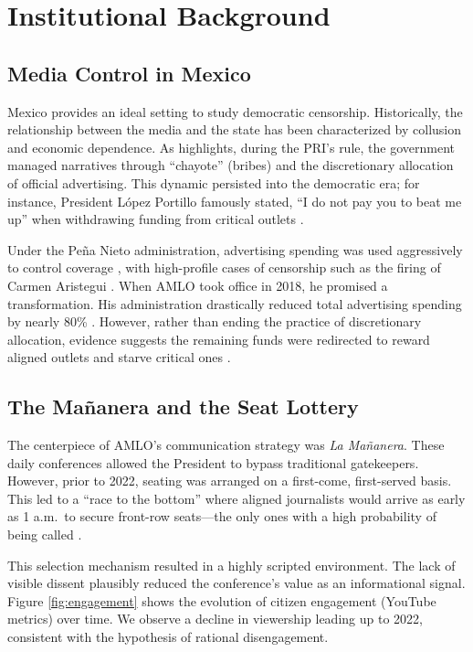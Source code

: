 \documentclass[12pt]{article}
\begin{document}
\section{Institutional Background}

\subsection{Media Control in Mexico}
Mexico provides an ideal setting to study democratic censorship. Historically, the relationship between the media and the state has been characterized by collusion and economic dependence. As \cite{FourthState-Lawson-Book} highlights, during the PRI's rule, the government managed narratives through ``chayote'' (bribes) and the discretionary allocation of official advertising. This dynamic persisted into the democratic era; for instance, President López Portillo famously stated, ``I do not pay you to beat me up'' when withdrawing funding from critical outlets \citep{PrensaVendida-Rod}.

Under the Peña Nieto administration, advertising spending was used aggressively to control coverage \citep{Times}, with high-profile cases of censorship such as the firing of Carmen Aristegui \citep{WashPost-Aristegui}. When AMLO took office in 2018, he promised a transformation. His administration drastically reduced total advertising spending by nearly 80\% \citep{Article19}. However, rather than ending the practice of discretionary allocation, evidence suggests the remaining funds were redirected to reward aligned outlets and starve critical ones \citep{Animal-Discrecionalidad}.

\subsection{The Mañanera and the Seat Lottery}
The centerpiece of AMLO's communication strategy was \textit{La Mañanera}. These daily conferences allowed the President to bypass traditional gatekeepers. However, prior to 2022, seating was arranged on a first-come, first-served basis. This led to a ``race to the bottom'' where aligned journalists would arrive as early as 1 a.m.\ to secure front-row seats---the only ones with a high probability of being called \citep{Tombola-Razon}.

This selection mechanism resulted in a highly scripted environment. The lack of visible dissent plausibly reduced the conference's value as an informational signal. Figure \ref{fig:engagement} shows the evolution of citizen engagement (YouTube metrics) over time. We observe a decline in viewership leading up to 2022, consistent with the hypothesis of rational disengagement.
\end{document}
